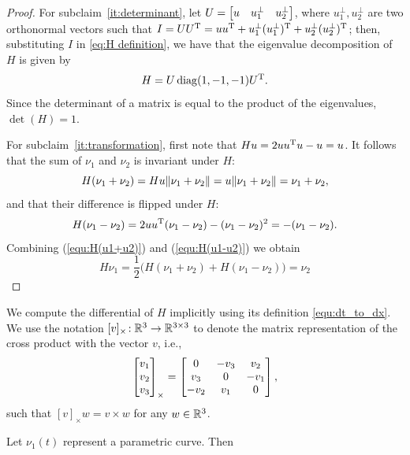 \documentclass[10pt,twocolumn,twoside]{IEEEtran}
\begin{document}
{\begin{proof}
  For subclaim~\ref{it:determinant}, let $U=\begin{bmatrix}u & u^\bot_{1} & u^\bot_{2}\end{bmatrix}$, where $u^\bot_{1},u^\bot_{2}$ are two orthonormal vectors such that $I=UU^\mathrm{T}=uu^\mathrm{T} + u^\bot_{1}(u^\bot_{1})^\mathrm{T}+u^\bot_{2}(u^\bot_{2})^\mathrm{T}$; then, substituting $I$ in \eqref{eq:H definition}, we have that the eigenvalue decomposition of $H$ is given by
  \begin{equation}
    H=U\operatorname{diag}(1,-1,-1) U^\mathrm{T}.
  \end{equation}
  Since the determinant of a matrix is equal to the product of the eigenvalues, $\det(H)=1$.

  For subclaim~\ref{it:transformation}, first note that $Hu=2uu^\mathrm{T} u - u=u$.
  It follows that the sum of $\nu_1$ and $\nu_2$ is invariant under $H$:
  \begin{equation}\label{equ:H(u1+u2)}
    H(\nu_1+\nu_2)=H u \lVert\nu_1+\nu_2\rVert
    = u\lVert\nu_1+\nu_2\rVert =\nu_1+\nu_2,
  \end{equation}
  and that their difference is flipped under $H$:
  \begin{equation}\label{equ:H(u1-u2)}
    H(\nu_1-\nu_2) = 2uu^\mathrm{T} (\nu_1-\nu_2) - (\nu_1-\nu_2)^2 = -(\nu_1-\nu_2).
  \end{equation}
  Combining (\ref{equ:H(u1+u2)}) and (\ref{equ:H(u1-u2)}) we obtain
  \begin{equation}
    H\nu_1 = \frac{1}{2}\bigl(H(\nu_1+\nu_2)+H(\nu_1-\nu_2)\bigr)
    = \nu_2
  \end{equation}
\end{proof}
We compute the differential of $H$ implicitly using its definition \eqref{equ:dt_to_dx}. We use the notation $[v]_{\times}\!:\mathbb{R}^{3}{}\to\mathbb{R}^{3\times 3}{}$ to denote the matrix representation of the cross product with the vector $v$, i.e.,
\begin{equation}
  \begin{bmatrix}v_1\\v_2\\v_3\end{bmatrix}_\times= \begin{bmatrix}0 & -v_3 &v_2\\v_3 & 0 & -v_1\\-v_2 & v_1 & 0\end{bmatrix},
\end{equation}
such that $[v]_\times w=v\times w$ for any $w\in\mathbb{R}^{3}{}$. %
\begin{proposition}\label{prop:Hderivitive}
  Let $\nu_1(t)$ represent a parametric curve. Then

\end{proposition}}
\end{document}
